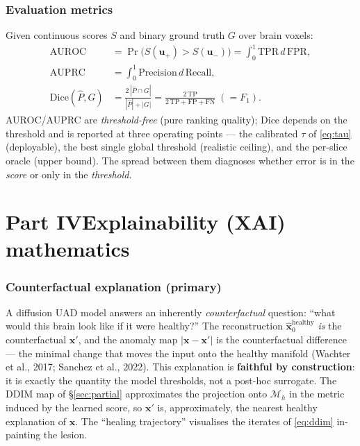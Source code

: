 \documentclass[12pt,a4paper]{article}
\newcommand{\x}{\bm{x}}
\begin{document}
\section{Evaluation metrics}
Given continuous scores $S$ and binary ground truth $G$ over brain voxels:
\begin{align}
\mathrm{AUROC}&=\Pr\!\big(S(\bm u_+)>S(\bm u_-)\big)
=\int_0^1 \mathrm{TPR}\,d\,\mathrm{FPR}, \\[2pt]
\mathrm{AUPRC}&=\int_0^1 \mathrm{Precision}\,d\,\mathrm{Recall}, \\[2pt]
\mathrm{Dice}(\hat P,G)&=\frac{2\,|\hat P\cap G|}{|\hat P|+|G|}
=\frac{2\,\mathrm{TP}}{2\,\mathrm{TP}+\mathrm{FP}+\mathrm{FN}}\;(=F_1).
\label{eq:metrics}
\end{align}
AUROC/AUPRC are \emph{threshold-free} (pure ranking quality); Dice depends on the
threshold and is reported at three operating points --- the calibrated $\tau$ of
\eqref{eq:tau} (deployable), the best single global threshold (realistic
ceiling), and the per-slice oracle (upper bound). The spread between them
diagnoses whether error is in the \emph{score} or only in the \emph{threshold}.

\part*{Part IV\quad Explainability (XAI) mathematics}
\label{part:xai}

\section{Counterfactual explanation (primary)}
A diffusion UAD model answers an inherently \emph{counterfactual} question:
``what would this brain look like if it were healthy?'' The reconstruction
$\hat{\x}_0^{\text{healthy}}$ \emph{is} the counterfactual $\x'$, and the anomaly
map $|\x-\x'|$ is the counterfactual difference --- the minimal change that moves
the input onto the healthy manifold (Wachter et al., 2017; Sanchez et al., 2022).
This explanation is \textbf{faithful by construction}: it is exactly the quantity
the model thresholds, not a post-hoc surrogate. The DDIM map of
\S\ref{sec:partial} approximates the projection onto $\mathcal M_h$ in the
metric induced by the learned score, so $\x'$ is, approximately, the nearest
healthy explanation of $\x$. The ``healing trajectory'' visualises the iterates
of \eqref{eq:ddim} in-painting the lesion.
\end{document}
